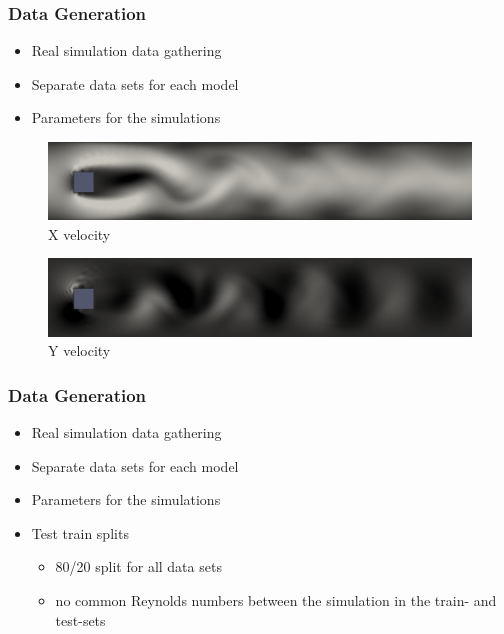 \documentclass[18pt, xcolor=table]{beamer}
\begin{document}
\begin{frame}[t]
  \frametitle{Data Generation}
  \begin{itemize}
  \item Real simulation data gathering
  \item Separate data sets for each model
  \item Parameters for the simulations
  \end{itemize}
  \begin{center}
    \begin{figure}[htb]
      \includegraphics[scale=0.2]{images/flows/flow_x}
      \caption{X velocity}
      \vspace{-0.2cm}
    \end{figure}

    \begin{figure}[htb]
      \includegraphics[scale=0.2]{images/flows/flow_y}
      \vspace{-0.2cm}
      \caption{Y velocity}
    \end{figure}
  \end{center}
\end{frame}

\begin{frame}[t]
  \frametitle{Data Generation}

  \begin{itemize}
  \item Real simulation data gathering
  \item Separate data sets for each model
  \item Parameters for the simulations
  \item Test train splits
    \begin{itemize}
    \item 80\slash 20 split for all data sets
    \item no common Reynolds numbers between the simulation in the train- and test-sets
    \end{itemize}
  \end{itemize}
\end{frame}
\end{document}
